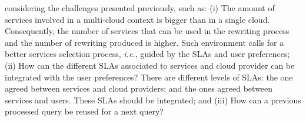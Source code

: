 considering the challenges presented previously, such as:
(i) The amount of services involved in a multi-cloud context is bigger than in a
single cloud. Consequently, the number of services that can be used in the
rewriting process and the number of rewriting produced is higher. Such
environment calls for a better services selection process, \textit{i.e.}, guided
by the SLAs and user preferences; (ii) How can the different SLAs associated to
services and cloud provider can be integrated with the user preferences? There
are different levels of SLAs: the one agreed between services and cloud
providers; and the ones agreed between services and users. These SLAs should be
integrated; and (iii) How can a previous processed query be reused for a next query?

\bigskip
